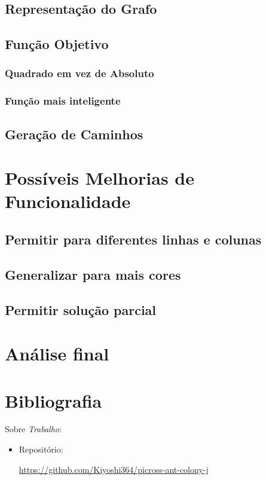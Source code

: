 \documentclass{article}
\begin{document}
\subsection{Representação do Grafo}

\subsection{Função Objetivo}
\subsubsection{Quadrado em vez de Absoluto}
\subsubsection{Função mais inteligente}

\subsection{Geração de Caminhos}

\section{Possíveis Melhorias de Funcionalidade}
\subsection{Permitir para diferentes linhas e colunas}
\subsection{Generalizar para mais cores}
\subsection{Permitir solução parcial}

\section{Análise final}

\section{Bibliografia} \label{s:bib}

Sobre \emph{Trabalho}:
\begin{itemize}
    \item Repositório: \par
    \url{https://github.com/Kiyoshi364/picross-ant-colony-j}
\end{itemize}
\end{document}
